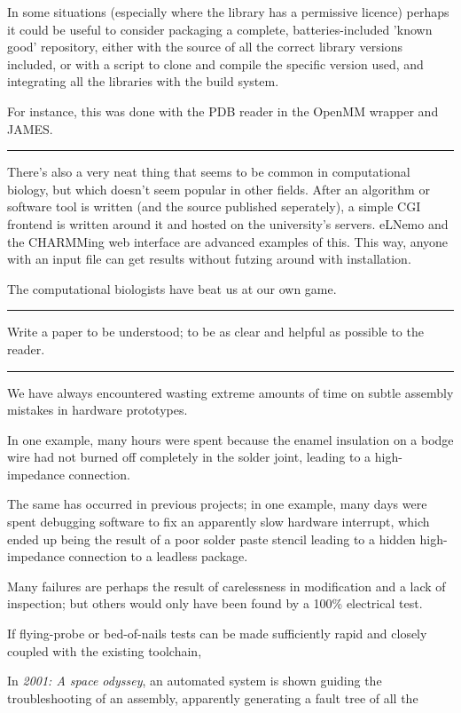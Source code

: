 \documentclass[fleqn,10pt]{article}
\begin{document}
\begin{multicols}{1}
In some situations (especially where the library has a permissive licence) perhaps it could be useful to consider packaging a complete, batteries-included 'known good' repository, either with the source of all the correct library versions included, or with a script to clone and compile the specific version used, and integrating all the libraries with the build system. 

For instance, this was done with the PDB reader in the OpenMM wrapper and JAMES.

\rule{\linewidth}{0.2pt}

There's also a very neat thing that seems to be common in computational biology, but which doesn't seem popular in other fields. After an algorithm or software tool is written (and the source published seperately), a simple CGI frontend is written around it and hosted on the university's servers. eLNemo and the CHARMMing web interface are advanced examples of this. This way, anyone with an input file can get results without futzing around with installation. 

The computational biologists have beat us at our own game.

\rule{\linewidth}{0.2pt}


Write a paper to be understood; to be as clear and helpful as possible to the reader.

\rule{\linewidth}{0.2pt}

We have always encountered wasting extreme amounts of time on subtle assembly mistakes in hardware prototypes. 

In one example, many hours were spent because the enamel insulation on a bodge wire had not burned off completely in the solder joint, leading to a high-impedance connection.

The same has occurred in previous projects; in one example, many days were spent debugging software to fix an apparently slow hardware interrupt, which ended up being the result of a poor solder paste stencil leading to a hidden high-impedance connection to a leadless package.

Many failures are perhaps the result of carelessness in modification and a lack of inspection; but others would only have been found by a 100\% electrical test.

If flying-probe or bed-of-nails tests can be made sufficiently rapid and closely coupled with the existing toolchain, 

In {\it 2001: A space odyssey}, an automated system is shown guiding the troubleshooting of an assembly, apparently generating a fault tree of all the 


\end{multicols}
\end{document}
